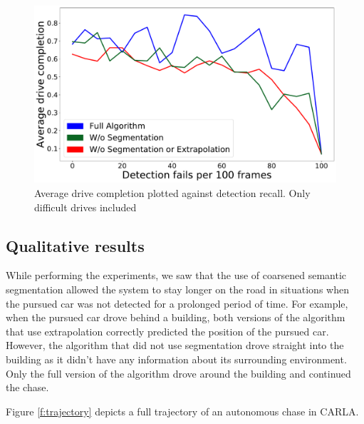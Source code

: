 \documentclass{ctuthesis/ctuthesis}
\begin{document}
\begin{figure}[]
    \centering
    \includegraphics[width=1\textwidth]{images/recall_chart7_difficult.pdf}
    
    \caption{Average drive completion plotted against detection recall. Only difficult drives included}\label{f:detection_recall_difficult}
\end{figure}


\subsection{Qualitative results}
While performing the experiments, we saw that the use of coarsened semantic segmentation allowed the system to stay longer on the road in situations when the pursued car was not detected for a prolonged period of time. For example, when the pursued car drove behind a building, both versions of the algorithm that use extrapolation correctly predicted the position of the pursued car. However, the algorithm that did not use segmentation drove straight into the building as it didn't have any information about its surrounding environment. Only the full version of the algorithm drove around the building and continued the chase.

Figure \ref{f:trajectory} depicts a full trajectory of an autonomous chase in CARLA.
\end{document}
